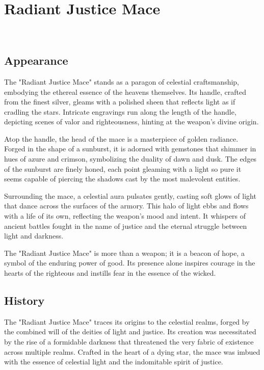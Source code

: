 
\chapter*{Radiant Justice Mace}
\\

\section*{Appearance}
The "Radiant Justice Mace" stands as a paragon of celestial craftsmanship, embodying the ethereal essence of the heavens themselves. Its handle, crafted from the finest silver, gleams with a polished sheen that reflects light as if cradling the stars. Intricate engravings run along the length of the handle, depicting scenes of valor and righteousness, hinting at the weapon's divine origin.

Atop the handle, the head of the mace is a masterpiece of golden radiance. Forged in the shape of a sunburst, it is adorned with gemstones that shimmer in hues of azure and crimson, symbolizing the duality of dawn and dusk. The edges of the sunburst are finely honed, each point gleaming with a light so pure it seems capable of piercing the shadows cast by the most malevolent entities.

Surrounding the mace, a celestial aura pulsates gently, casting soft glows of light that dance across the surfaces of the armory. This halo of light ebbs and flows with a life of its own, reflecting the weapon's mood and intent. It whispers of ancient battles fought in the name of justice and the eternal struggle between light and darkness.

The "Radiant Justice Mace" is more than a weapon; it is a beacon of hope, a symbol of the enduring power of good. Its presence alone inspires courage in the hearts of the righteous and instills fear in the essence of the wicked.

\section*{History}
The "Radiant Justice Mace" traces its origins to the celestial realms, forged by the combined will of the deities of light and justice. Its creation was necessitated by the rise of a formidable darkness that threatened the very fabric of existence across multiple realms. Crafted in the heart of a dying star, the mace was imbued with the essence of celestial light and the indomitable spirit of justice.

